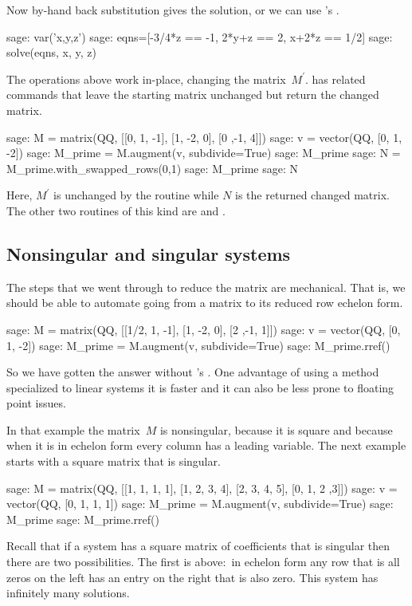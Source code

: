 Now by-hand back substitution gives the solution, or we can 
use \Sage's .
\begin{sagecommandline}
sage: var('x,y,z')
sage: eqns=[-3/4*z == -1, 2*y+z == 2, x+2*z == 1/2]
sage: solve(eqns, x, y, z)
\end{sagecommandline}

The operations above
work in-place, changing the matrix~$M^\prime$.
\Sage{} has related commands that leave the starting matrix unchanged
but return the changed matrix.
\begin{sagecommandline}
sage: M = matrix(QQ, [[0, 1, -1], [1, -2, 0], [0 ,-1, 4]])
sage: v = vector(QQ, [0, 1, -2])
sage: M_prime = M.augment(v, subdivide=True) 
sage: M_prime
sage: N = M_prime.with_swapped_rows(0,1)
sage: M_prime
sage: N      
\end{sagecommandline}
Here, $M^\prime$ is unchanged by the routine while $N$ is the returned 
changed matrix.
The other two routines of this kind are  
and .




\subsection{Nonsingular and singular systems}
The steps that we went through to reduce the matrix are mechanical.
That is, we should be able to automate going from a matrix to its
reduced row echelon form.
\begin{sagecommandline}
sage: M = matrix(QQ, [[1/2, 1, -1], [1, -2, 0], [2 ,-1, 1]])
sage: v = vector(QQ, [0, 1, -2])
sage: M_prime = M.augment(v, subdivide=True) 
sage: M_prime.rref()
\end{sagecommandline}
So we have gotten the answer without \Sage's .
One advantage of using a method specialized
to linear systems it is faster and it can also be less prone to floating point
issues.

In that example the matrix~$M$ is nonsingular, because it is 
square and because when it is in echelon form every
column has a leading variable.
The next example starts with a
square matrix that is singular. 
\begin{sagecommandline}
sage: M = matrix(QQ, [[1, 1, 1, 1], [1, 2, 3, 4], [2, 3, 4, 5], [0, 1, 2 ,3]]) 
sage: v = vector(QQ, [0, 1, 1, 1]) 
sage: M_prime = M.augment(v, subdivide=True)
sage: M_prime
sage: M_prime.rref()
\end{sagecommandline}
Recall that if a system has a square matrix of coefficients 
that is singular then there are two possibilities.
The first is above:~in echelon form
any row that is all zeros on the
left has an entry on the right that is also zero.
This system has infinitely many solutions.

